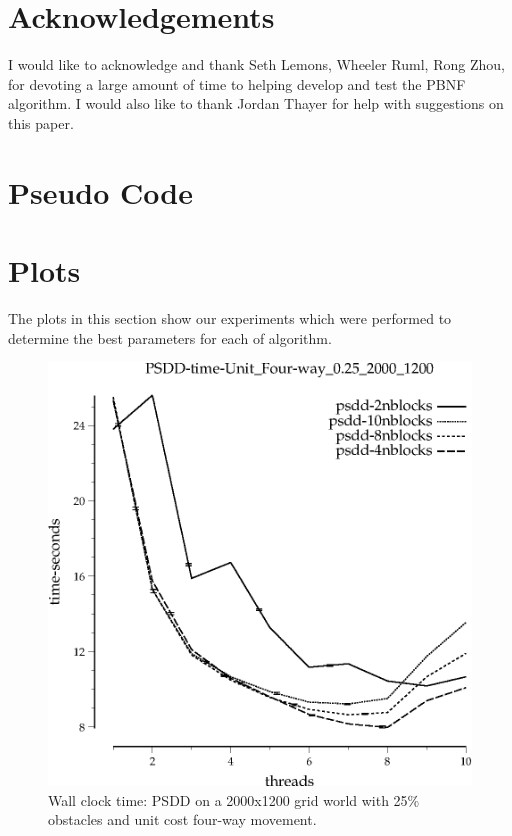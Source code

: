 \documentclass{article}
\begin{document}
\section{Acknowledgements}

I would like to acknowledge and thank Seth Lemons, Wheeler Ruml, Rong
Zhou, for devoting a large amount of time to helping develop and test
the PBNF algorithm.  I would also like to thank Jordan Thayer for help
with suggestions on this paper.




\begin{appendices}
\section{Pseudo Code}



\section{Plots}

The plots in this section show our experiments which were performed to
determine the best parameters for each of algorithm.

\begin{figure}[h]
\begin{center}
\includegraphics{../graphs/grid_unit_four-way_0.25_2000_1200/PSDD-time-Unit_Four-way_0.25_2000_1200.eps}
\caption{Wall clock time: PSDD on a 2000x1200 grid world with 25\%
  obstacles and unit cost four-way movement.}
\end{center}
\end{figure}


\end{appendices}
\end{document}
